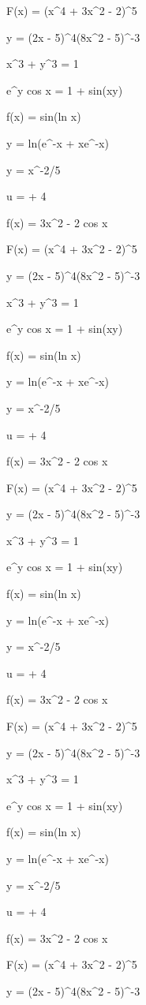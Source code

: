 \documentclass[11pt,a4paper]{article}
\begin{document}
 F(x) = (x^4 + 3x^2 - 2)^5

 y = (2x - 5)^4(8x^2 - 5)^{-3}

 x^3 + y^3 = 1

 e^y cos x = 1 + sin(xy)

 f(x) = sin(ln x)

 y = ln(e^{-x} + xe^{-x})

y = x^{-2/5}

u =  + 4

f(x) = 3x^2 - 2 cos x


 F(x) = (x^4 + 3x^2 - 2)^5

 y = (2x - 5)^4(8x^2 - 5)^{-3}

 x^3 + y^3 = 1

 e^y cos x = 1 + sin(xy)

 f(x) = sin(ln x)

 y = ln(e^{-x} + xe^{-x})

y = x^{-2/5}

u =  + 4

f(x) = 3x^2 - 2 cos x


 F(x) = (x^4 + 3x^2 - 2)^5

 y = (2x - 5)^4(8x^2 - 5)^{-3}

 x^3 + y^3 = 1

 e^y cos x = 1 + sin(xy)

 f(x) = sin(ln x)

 y = ln(e^{-x} + xe^{-x})

y = x^{-2/5}

u =  + 4

f(x) = 3x^2 - 2 cos x


 F(x) = (x^4 + 3x^2 - 2)^5

 y = (2x - 5)^4(8x^2 - 5)^{-3}

 x^3 + y^3 = 1

 e^y cos x = 1 + sin(xy)

 f(x) = sin(ln x)

 y = ln(e^{-x} + xe^{-x})

y = x^{-2/5}

u =  + 4

f(x) = 3x^2 - 2 cos x


 F(x) = (x^4 + 3x^2 - 2)^5

 y = (2x - 5)^4(8x^2 - 5)^{-3}
\end{document}
